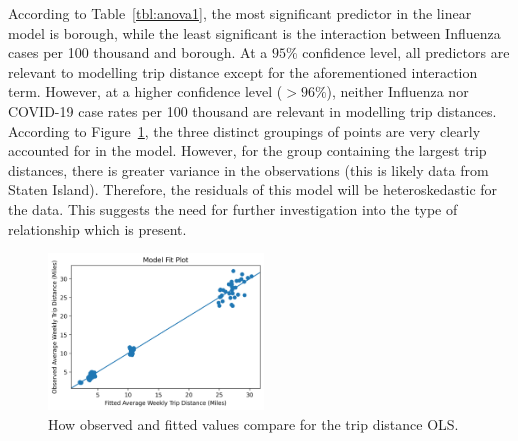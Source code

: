 \documentclass[11pt]{article}
\begin{document}
\begin{multicols}{2}
    According to Table~\ref{tbl:anova1}, the most significant predictor in the linear model is borough,
    while the least significant is the interaction between Influenza cases per 100 thousand and borough.
    At a $95\%$ confidence level, all predictors are relevant to modelling trip distance except for the
    aforementioned interaction term. However, at a higher confidence level ($>96\%$), 
    neither Influenza nor COVID-19 case rates per 100 thousand are relevant in modelling trip distances.
    According to Figure~\ref{fig:ols}, the three distinct groupings of points are very clearly accounted for in the model.
    However, for the group containing the largest trip distances, there is greater variance in the observations
    (this is likely data from Staten Island).
    Therefore, the residuals of this model will be heteroskedastic for the data.
    This suggests the need for further investigation into the type of relationship which is present.

    \begin{figure}[H]
        \includegraphics[width=0.51\textwidth]{../plots/diagnostic-Observed Average Weekly Trip Distance (Miles)-vs-Fitted Average Weekly Trip Distance (Miles).png}
        \centering
        \caption{How observed and fitted values compare for the trip distance OLS.} %
        \label{fig:ols}
    \end{figure}

\end{multicols}
\end{document}
